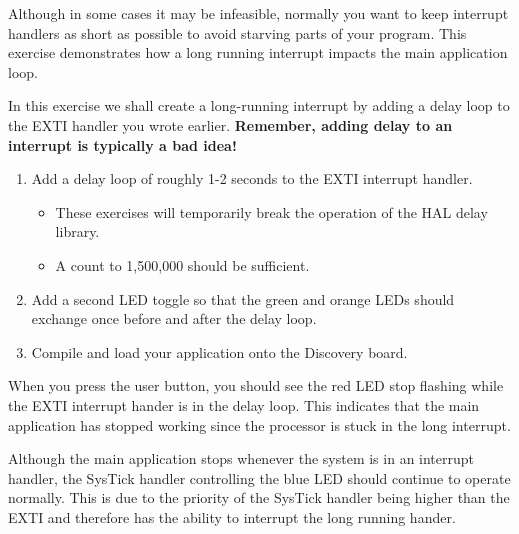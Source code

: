 \documentclass[openany,11pt,fleqn]{book} %
\begin{document}
\begin{exercise}
    \label{ex6}
   Although in some cases it may be infeasible, normally you want to keep interrupt handlers as short as possible to avoid starving parts of your program. This exercise demonstrates how a long running interrupt impacts the main application loop. 

   In this exercise we shall create a long-running interrupt by adding a delay loop to the EXTI handler you wrote earlier. \textbf{Remember, adding delay to an interrupt is typically a bad idea!} 
   \begin{enumerate}
       \item Add a delay loop of roughly 1-2 seconds to the EXTI interrupt handler.
       \begin{itemize}
           \item These exercises will temporarily break the operation of the HAL delay library.
           \item A count to 1,500,000 should be sufficient. 
       \end{itemize} 
       \item Add a second LED toggle so that the green and orange LEDs should exchange once before and after the delay loop. 
       \item Compile and load your application onto the Discovery board.
   \end{enumerate}
   
    \noindent When you press the user button, you should see the red LED stop flashing while the EXTI interrupt hander is in the delay loop. This indicates that the main application has stopped working since the processor is stuck in the long interrupt. 
    
   Although the main application stops whenever the system is in an interrupt handler, the SysTick handler controlling the blue LED should continue to operate normally. This is due to the priority of the SysTick handler being higher than the EXTI and therefore has the ability to interrupt the long running hander.
\end{exercise}
  
\end{document}
